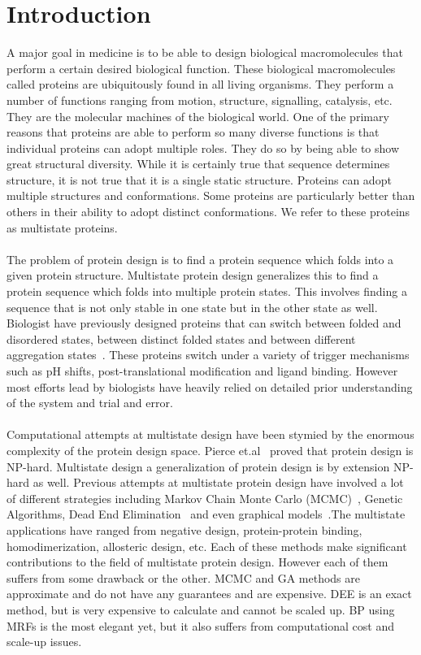 \documentclass{article}
\begin{document}
\section{Introduction}
A major goal in medicine is to be able to design biological macromolecules that perform a certain desired biological function. These biological macromolecules called proteins are ubiquitously found in all living organisms. They perform a number of functions ranging from motion, structure, signalling, catalysis, etc. They are the molecular machines of the biological world. One of the primary reasons that proteins are able to perform so many diverse functions is that individual proteins can adopt multiple roles. They do so by being able to show great structural diversity. While it is certainly true that sequence determines structure, it is not true that it is a single static structure. Proteins can adopt multiple structures and conformations. Some proteins are particularly better than others in their ability to adopt distinct conformations. We refer to these proteins as multistate proteins. 
\\
\\
The problem of protein design is to find a protein sequence which folds into a given protein structure. Multistate protein design generalizes this to find a protein sequence which folds into multiple protein states. This involves finding a sequence that is not only stable in one state but in the other state as well. Biologist have previously designed proteins that can switch between folded and disordered states, between distinct folded states and between different aggregation states~\cite{Ambroggio2006}. These proteins switch under a variety of trigger mechanisms such as pH shifts, post-translational modification and ligand binding. However most efforts lead by biologists have heavily relied on detailed prior understanding of the system and trial and error. 
\\
\\
Computational attempts at multistate design have been stymied by the enormous complexity of the protein design space. Pierce et.al~\cite{Pierce2002} proved that protein design is NP-hard. Multistate design a generalization of protein design is by extension NP-hard as well. Previous attempts at multistate protein design have involved a lot of different strategies including Markov Chain Monte Carlo (MCMC)~\cite{Leaver-Fay2011,Ambroggio2006}, Genetic Algorithms, Dead End Elimination~\cite{Yanover2007} and even graphical models~\cite{Fromer2010}.The multistate applications have ranged from negative design, protein-protein binding, homodimerization, allosteric design, etc. Each of these methods make significant contributions to the field of multistate protein design. However each of them suffers from some drawback or the other. MCMC and GA methods are approximate and do not have any guarantees and are expensive. DEE is an exact method, but is very expensive to calculate and cannot be scaled up. BP using MRFs is the most elegant yet, but it also suffers from computational cost and scale-up issues. 
\end{document}
